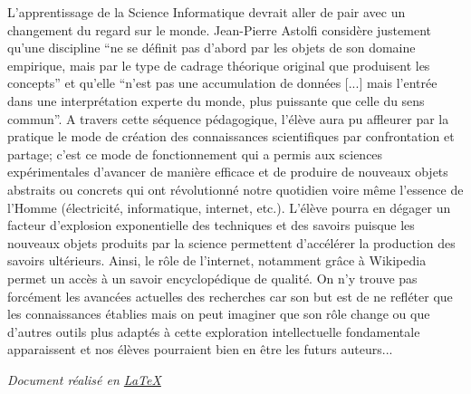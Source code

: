 \documentclass[11pt,bibliography=totoc]{scrartcl}
\begin{document}
L'apprentissage de la Science Informatique devrait aller de pair avec un
changement du regard sur le monde. Jean-Pierre Astolfi \cite{astolfi} considère
justement qu'une discipline ``ne se définit pas d'abord par les objets de son
domaine empirique, mais par le type de cadrage théorique original que produisent
les concepts'' et qu'elle ``n'est pas une accumulation de données [...] mais
l'entrée dans une interprétation experte du monde, plus puissante que celle du
sens commun''.
A travers cette séquence pédagogique, l'élève aura pu affleurer par la pratique le mode de création des connaissances scientifiques par confrontation et partage; c'est ce mode de fonctionnement qui a permis aux sciences expérimentales d'avancer de manière efficace et de produire de nouveaux objets abstraits ou concrets qui ont révolutionné notre quotidien voire même l'essence de l'Homme (électricité, informatique, internet, etc.). L'élève pourra en dégager un facteur d'explosion exponentielle des techniques et des savoirs puisque les nouveaux objets produits par la science permettent d'accélérer la production des savoirs ultérieurs. Ainsi, le rôle de l'internet, notamment grâce à Wikipedia permet un accès à un savoir encyclopédique de qualité. On n'y trouve pas forcément les avancées actuelles des recherches car son but est de ne refléter que les connaissances établies mais on peut imaginer que son rôle change ou que d'autres outils plus adaptés à cette exploration intellectuelle fondamentale apparaissent et nos élèves pourraient bien en être les futurs auteurs...

\printbibliography  %
\vfill
\emph{Document réalisé en \href{https://www.latex-project.org/}{\LaTeX}}

\end{document}
